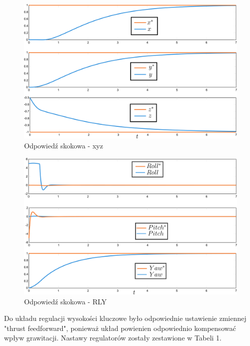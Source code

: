 \documentclass[polish,11pt,a4paper]{article}
\begin{document}
\begin{figure}[H]
	\centering
	\includegraphics[width=1\linewidth]{strojenie/XYZ}
	\caption{Odpowiedź skokowa - xyz}
	\label{fig:xyz}
\end{figure}

\begin{figure}[H]
	\centering
	\includegraphics[width=1\linewidth]{strojenie/RLY}
	\caption{Odpowiedź skokowa - RLY}
	\label{fig:RLY}
\end{figure}

Do układu regulacji wysokości kluczowe było odpowiednie ustawienie zmiennej "thrust feedforward", ponieważ 
układ powienien odpowiednio kompensować wpływ grawitacji. Nastawy regulatorów zostały zestawione w Tabeli 1.
\end{document}
